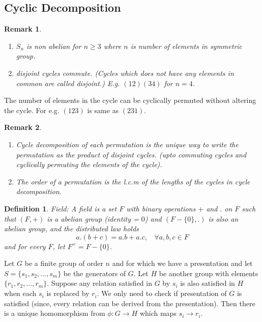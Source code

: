 \documentclass[12pt]{report}
\newtheorem{defn}{Definition}
\newtheorem*{rem}{Remark}
\begin{document}
\subsection*{Cyclic Decomposition}
\begin{rem}
    \begin{enumerate}
        \item $S_n$ is non abelian for $n \geq 3$ where $n$ is number of elements in symmetric group.
        \item disjoint cycles commute. (Cycles which does not have any elements in common are called disjoint.) E.g. $(12)(34)$ for $n = 4$.
    \end{enumerate}
\end{rem}
The number of elements in the cycle can be cyclically permuted without altering the cycle. For e.g. $(123)$ is same as $(231)$.
\begin{rem}
    \begin{enumerate}
        \item Cycle decomposition of each permutation is the unique way to write the permutation as the product of disjoint cycles. (upto commuting cycles and cyclically permuting the elements of the cycle).
        \item The order of a permutation is the l.c.m of the lengths of the cycles in cycle decomposition. 
    \end{enumerate}
\end{rem}
\begin{defn}
    Field: A field is a set $F$ with binary operations $+$ and $.$ on $F$ such that $(F,+)$ is a abelian group (identity = $0$) and $(F-\{0\}, .)$ is also an abelian group, and the distributed law holds
    $$ a . (b + c) = a.b + a.c,~~~~\forall a,b,c \in F$$ 
    and for every $F$, let $F^{\times} = F - \{0\}$. 
\end{defn}
Let $G$ be a finite group of order $n$ and for which we have a presentation and let $S = \{s_1, s_2, \dots, s_m\}$ be the generators of $G$. Let $H$ be another group with elements $\{r_1, r_2, \dots, r_m\}$. Suppose any relation satisfied in $G$ by $s_i$ is also satisfied in $H$ when each $s_i$ is replaced by $r_i$. We only need to check if presentation of $G$ is satisfied (since, every relation can be derived from the presentation). Then there is a unique homomorphism from $\phi:G \to H$ which maps $s_i \to r_i$.
\end{document}
